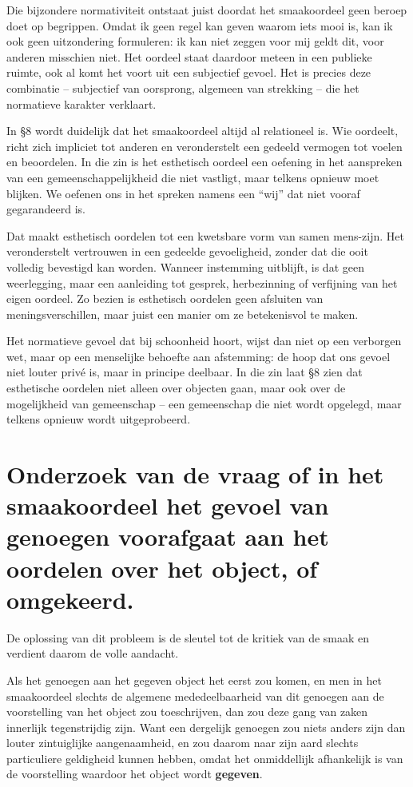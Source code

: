 \begin{mdframed}[leftmargin=0pt,rightmargin=0pt,backgroundcolor=blue!6,linecolor=white,innertopmargin=6pt,innerbottommargin=6pt]
Die bijzondere normativiteit ontstaat juist doordat het smaakoordeel geen beroep doet op begrippen. Omdat ik geen regel kan geven waarom iets mooi is, kan ik ook geen uitzondering formuleren: ik kan niet zeggen voor mij geldt dit, voor anderen misschien niet. Het oordeel staat daardoor meteen in een publieke ruimte, ook al komt het voort uit een subjectief gevoel. Het is precies deze combinatie – subjectief van oorsprong, algemeen van strekking – die het normatieve karakter verklaart.

In §8 wordt duidelijk dat het smaakoordeel altijd al relationeel is. Wie oordeelt, richt zich impliciet tot anderen en veronderstelt een gedeeld vermogen tot voelen en beoordelen. In die zin is het esthetisch oordeel een oefening in het aanspreken van een gemeenschappelijkheid die niet vastligt, maar telkens opnieuw moet blijken. We oefenen ons in het spreken namens een “wij” dat niet vooraf gegarandeerd is.

Dat maakt esthetisch oordelen tot een kwetsbare vorm van samen mens-zijn. Het veronderstelt vertrouwen in een gedeelde gevoeligheid, zonder dat die ooit volledig bevestigd kan worden. Wanneer instemming uitblijft, is dat geen weerlegging, maar een aanleiding tot gesprek, herbezinning of verfijning van het eigen oordeel. Zo bezien is esthetisch oordelen geen afsluiten van meningsverschillen, maar juist een manier om ze betekenisvol te maken.

Het normatieve gevoel dat bij schoonheid hoort, wijst dan niet op een verborgen wet, maar op een menselijke behoefte aan afstemming: de hoop dat ons gevoel niet louter privé is, maar in principe deelbaar. In die zin laat §8 zien dat esthetische oordelen niet alleen over objecten gaan, maar ook over de mogelijkheid van gemeenschap – een gemeenschap die niet wordt opgelegd, maar telkens opnieuw wordt uitgeprobeerd.

\end{mdframed}

\section{Onderzoek van de vraag of in het smaakoordeel het gevoel van genoegen voorafgaat aan het oordelen over het object, of omgekeerd.}

De oplossing van dit probleem is de sleutel tot de kritiek van de smaak en verdient daarom de volle aandacht.

Als het genoegen aan het gegeven object het eerst zou komen, en men in het smaakoordeel slechts de algemene mededeelbaarheid van dit genoegen aan de voorstelling van het object zou toeschrijven, dan zou deze gang van zaken innerlijk tegenstrijdig zijn. Want een dergelijk genoegen zou niets anders zijn dan louter zintuiglijke aangenaamheid, en zou daarom naar zijn aard slechts particuliere geldigheid kunnen hebben, omdat het onmiddellijk afhankelijk is van de voorstelling waardoor het object wordt \textbf{gegeven}.

